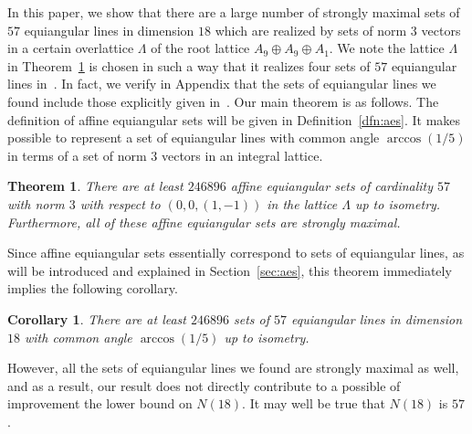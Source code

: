 \documentclass[reqno, 11pt]{amsart}
\numberwithin{equation}{section}
\newtheorem{thm}[lem]{Theorem}%
\newtheorem{cor}[lem]{Corollary}%
\theoremstyle{definition}
\begin{document}
In this paper, we show that there are a large number of strongly maximal sets of $57$ equiangular lines in dimension $18$ which are realized by sets of norm $3$ vectors in a certain overlattice $\Lambda$ of the root lattice $A_9\oplus A_9\oplus A_1$.
We note the lattice $\Lambda$ in Theorem~\ref{thm:main} is chosen in such a way that it realizes four sets of $57$ equiangular lines in~\cite{Greaves2023}.
In fact, we verify in 
Appendix
that the sets of equiangular lines we found include those explicitly given in~\cite{Greaves2023}.
Our main theorem is as follows. The definition of affine equiangular sets will be given in Definition~\ref{dfn:aes}. It makes possible to represent a set of equiangular lines with common angle $\arccos(1/5)$ in terms of a set of norm $3$ vectors in an integral lattice.
\begin{thm} \label{thm:main}
	There are at least $246896$ affine equiangular sets of cardinality $57$ with norm $3$ with respect to $(0,0,(1,-1))$ in the lattice $\Lambda$ up to isometry.
	Furthermore, all of these affine equiangular sets are strongly maximal.
\end{thm}
Since affine equiangular sets essentially correspond to sets of equiangular lines, as will be introduced and explained in Section~\ref{sec:aes}, this theorem immediately implies the following corollary. 
\begin{cor}	\label{cor:main}
	There are at least $246896$ sets of $57$ equiangular lines in dimension $18$ with common angle $\arccos(1/5)$ up to isometry.
\end{cor}
However, all the sets of equiangular lines we found are strongly maximal as well, and as a result, our result does not directly contribute to a possible of improvement the lower bound on $N(18)$.
It may well be true that $N(18)$ is $57$.
\end{document}
